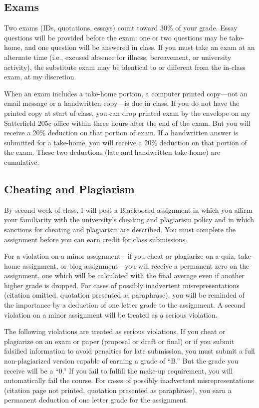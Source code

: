 \documentclass[]{article}
\begin{document}
\subsection{Exams}\label{exams}

Two exams (IDs, quotations, essays) count toward 30\% of your grade.
Essay questions will be provided before the exam: one or two questions
may be take-home, and one question will be answered in class. If you
must take an exam at an alternate time (i.e., excused absence for
illness, bereavement, or university activity), the substitute exam may
be identical to or different from the in-class exam, at my discretion.

When an exam includes a take-home portion, a computer printed copy---not
an email message or a handwritten copy---is due in class. If you do not
have the printed copy at start of class, you can drop printed exam by
the envelope on my Satterfield 205c office within three hours after the
end of the exam. But you will receive a 20\% deduction on that portion
of exam. If a handwritten answer is submitted for a take-home, you will
receive a 20\% deduction on that portion of the exam. These two
deductions (late and handwritten take-home) are cumulative.

\subsection{Cheating and Plagiarism}\label{cheating-and-plagiarism}

By second week of class, I will post a Blackboard assignment in which
you affirm your familiarity with the university's cheating and
plagiarism policy and in which sanctions for cheating and plagiarism are
described. You must complete the assignment before you can earn credit
for class submissions.

For a violation on a minor assignment---if you cheat or plagiarize on a
quiz, take-home assignment, or blog assignment---you will receive a
permanent zero on the assignment, one which will be calculated with the
final average even if another higher grade is dropped. For cases of
possibly inadvertent misrepresentations (citation omitted, quotation
presented as paraphrase), you will be reminded of the importance by a
deduction of one letter grade to the assignment. A second violation on a
minor assignment will be treated as a serious violation.

The following violations are treated as serious violations. If you cheat
or plagiarize on an exam or paper (proposal or draft or final) or if you
submit falsified information to avoid penalties for late submission, you
must submit a full non-plagiarized version capable of earning a grade of
``B.'' But the grade you receive will be a ``0.'' If you fail to fulfill
the make-up requirement, you will automatically fail the course. For
cases of possibly inadvertent misrepresentations (citation page not
printed, quotation presented as paraphrase), you earn a permanent
deduction of one letter grade for the assignment.
\end{document}
